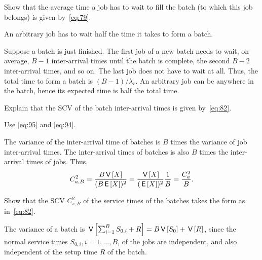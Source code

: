 \begin{exercise}\label{ex:48}
  Show that the average time a job has to wait to fill the batch (to which this job belongs) is given by~\cref{eq:79}. 
\begin{hint}
An arbitrary job has to wait half the time it takes  to form a batch.
 \end{hint}
\begin{solution}
  Suppose a batch is just finished.
  The first job of a new batch needs to wait, on average, $B-1$ inter-arrival times until the batch is complete, the second $B-2$ inter-arrival times, and so on.
  The last job does not have to wait at all.
  Thus, the total time to form a batch is $(B-1)/\lambda_r$.
  An arbitrary job can be anywhere in the batch, hence its expected time is half the total time.
\end{solution}
\end{exercise}


\begin{exercise}\label{ex:490}
Explain that the SCV of the batch inter-arrival times is given by~\cref{eq:82}.
\begin{hint}
Use  \cref{eq:95} and \cref{eq:94}.
\end{hint}
\begin{solution}
The variance of the inter-arrival time of batches is $B$ times the variance of job inter-arrival times. The inter-arrival times of batches is also $B$ times the inter-arrival times of jobs. Thus, 
\begin{equation*}
 C_{a,B}^2 = \frac{B \,\mathsf{V}\left[X\right]}{(B \,\mathsf{E}\left[X\right])^2} = \frac{\,\mathsf{V}\left[X\right]}{(\,\mathsf{E}\left[X\right])^2} \frac 1 B = \frac{C_a^2}{B}.
\end{equation*}
\end{solution}
\end{exercise}


\begin{exercise}\label{ex:491}
Show that the SCV $C_{s,B}^2$ of the service times of the batches takes the form as in~\cref{eq:82}.
\begin{solution}
 The variance of a batch is $\,\mathsf{V}\left[\sum_{i=1}^B S_{0,i} + R\right] = B\,\mathsf{V}\left[S_0\right] + \,\mathsf{V}\left[R\right]$, since the normal service times $S_{0,i}, i=1,\ldots,B$, of the jobs are independent, and also independent of the setup time $R$ of the batch.
\end{solution}
\end{exercise}

